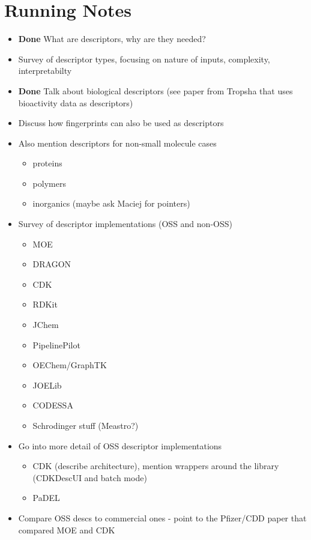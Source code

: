 \documentclass[letterpaper, 12pt]{article}
\begin{document}
\section{Running Notes}
\begin{itemize}
\item \textbf{Done} What are descriptors, why are they needed?
\item Survey of descriptor types, focusing on nature of inputs,
  complexity, interpretabilty 
\item \textbf{Done} Talk about biological descriptors (see paper from Tropsha that
  uses bioactivity data as descriptors)
\item Discuss how fingerprints can also be used as descriptors
\item Also mention descriptors for non-small molecule cases
  \begin{itemize}
  \item proteins
  \item polymers
  \item inorganics (maybe ask Maciej for pointers)
  \end{itemize}
\item Survey of descriptor implementations (OSS and non-OSS)
  \begin{itemize}
  \item MOE
  \item DRAGON
  \item CDK
  \item RDKit
  \item JChem
  \item PipelinePilot
  \item OEChem/GraphTK
  \item JOELib
  \item CODESSA
  \item Schrodinger stuff (Meastro?)
  \end{itemize}
\item Go into more detail of OSS descriptor implementations
  \begin{itemize}
  \item CDK (describe architecture), mention wrappers around the
    library (CDKDescUI and batch mode)
  \item PaDEL
  \end{itemize}
\item Compare OSS descs to commercial ones - point to the Pfizer/CDD
  paper that compared MOE and CDK
\end{itemize}
\clearpage
\newpage
\end{document}
